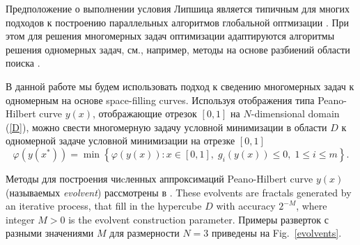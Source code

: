 \documentclass[
11pt,%
tightenlines,%
twoside,%
onecolumn,%
nofloats,%
nobibnotes,%
nofootinbib,%
superscriptaddress,%
noshowpacs,%
centertags]%
{revtex4}
\begin{document}
Предположение о выполнении условия Липшица является типичным для многих подходов к построению параллельных алгоритмов глобальной оптмизации \cite{Evtushenko2009,Zilinskas2011}. При этом для решения многомерных задач оптимизации адаптируются алгоритмы решения одномерных задач, см., например, методы на основе разбиений области поиска \cite{Zilinskas2014,Sergeyev2017}.

В данной работе мы будем использовать подход к сведению многомерных задач к одномерным на основе space-filling curves. 
Используя отображения типа Peano-Hilbert curve $y(x)$, отображающие отрезок $[0,1]$ на $N$-dimensional domain (\ref{D}),
можно свести многомерную задачу условной минимизации в области $D$ к одномерной задаче условной минимизации на отрезке $[0,1]$
\begin{equation}\label{problem1}
\varphi(y(x^\ast))=\min \left\{\varphi(y(x)): x \in [0,1], \; g_i(y(x))\leq 0, \; 1 \leq i \leq m\right\}.
\end{equation}

Методы для построения чиcленных аппроксимаций Peano-Hilbert curve $y(x)$ (называемых \textit{evolvent}) рассмотрены в \cite{Sergeyev2013}. These evolvents are fractals generated by an iterative process, that fill in the hypercube $D$ with accuracy $2^{-M}$, where integer $M>0$ is the evolvent construction parameter. 
Примеры разверток с разными значениями $M$  для размерности $N=3$ приведены на Fig.~\ref{evolvents}.
\end{document}
